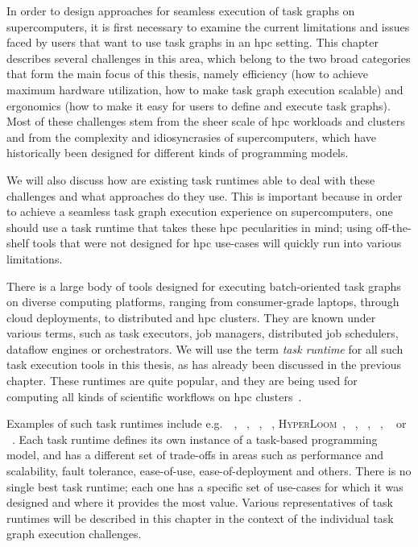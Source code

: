 In order to design approaches for seamless execution of task graphs on supercomputers, it is first necessary to examine
the current limitations and issues faced by users that want to use task graphs in an \gls{hpc} setting.
This chapter describes several challenges in this area, which belong to the two broad categories that form the main focus of this
thesis, namely efficiency (how to achieve maximum hardware utilization, how to make task graph execution scalable) and
ergonomics (how to make it easy for users to define and execute task graphs). Most of these challenges stem from the sheer
scale of \gls{hpc} workloads and clusters and from the complexity and idiosyncrasies of supercomputers, which have historically
been designed for different kinds of programming models.

We will also discuss how are existing task runtimes able to deal with these challenges and what approaches do they use.
This is important because in order to achieve a seamless task graph execution experience on supercomputers, one should
use a task runtime that takes these \gls{hpc} pecularities in mind; using off-the-shelf tools that
were not designed for \gls{hpc} use-cases will quickly run into various limitations.

There is a large body of tools designed for executing batch-oriented task graphs on diverse computing
platforms, ranging from consumer-grade laptops, through cloud deployments, to distributed and
\gls{hpc} clusters. They are known under various terms, such as task executors,
job managers, distributed job schedulers, dataflow engines or orchestrators. We will use the term
\emph{task runtime} for all such task execution tools in this thesis, as has already been
discussed in the previous chapter. These runtimes are quite popular, and they are being used for
computing all kinds of scientific workflows on \gls{hpc}
clusters~\cite{hpc_tasks, hpc_tasks_2, hpc_tasks_3, pegasus}.

Examples of such task runtimes include e.g.\ \dask~\cite{dask},
\parsl~\cite{parsl}, \ray~\cite{ray},
\pycompss~\cite{pycompss}, \textsc{HyperLoom}~\cite{hyperloom},
\gnuparallel~\cite{parallel}, \snakemake~\cite{snakemake}, \merlin~\cite{merlin},
\autosubmit~\cite{autosubmit} or \fireworks~\cite{fireworks}. Each task runtime
defines its own instance of a task-based programming model, and has a different set of trade-offs
in areas such as performance and scalability, fault tolerance, ease-of-use, ease-of-deployment and
others. There is no single best task runtime; each one has a specific set of use-cases for which it was designed
and where it provides the most value. Various representatives of task runtimes will be described in
this chapter in the context of the individual task graph execution challenges.

